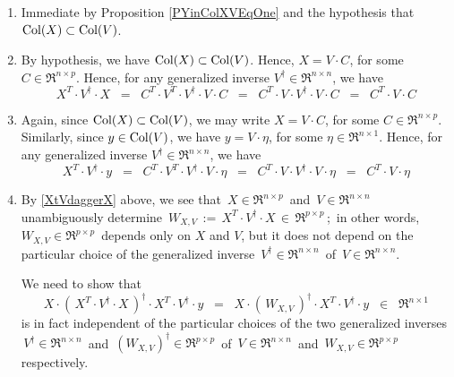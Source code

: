 \begin{enumerate}
\item
	Immediate by Proposition \ref{PYinColXVEqOne} and the hypothesis that $\textnormal{Col}(X) \subset \textnormal{Col}(V)$.
\item
	By hypothesis, we have $\textnormal{Col}(X) \subset \textnormal{Col}(V)$.
	Hence, $X = V \cdot C$, for some $C \in \Re^{n \times p}$.
	Hence, for any generalized inverse $V^{\dagger} \in \Re^{n \times n}$,
	we have
	\begin{equation*}
	X^{T} \cdot V^{\dagger} \cdot X
	\;\; = \;\;
		C^{T} \cdot V^{T} \cdot V^{\dagger} \cdot V \cdot C
	\;\; = \;\;
		C^{T} \cdot V \cdot V^{\dagger} \cdot V \cdot C
	\;\; = \;\;
		C^{T} \cdot V \cdot C
	\end{equation*}
\item
	Again, since $\textnormal{Col}(X) \subset \textnormal{Col}(V)$, we may write
	$X = V \cdot C$, for some $C \in \Re^{n \times p}$.
	Similarly, since $y \in \textnormal{Col}(V)$, we have $y = V \cdot \eta$,
	for some $\eta \in \Re^{n \times 1}$.
	Hence, for any generalized inverse $V^{\dagger} \in \Re^{n \times n}$,
	we have
	\begin{equation*}
	X^{T} \cdot V^{\dagger} \cdot y
	\;\; = \;\;
		C^{T} \cdot V^{T} \cdot V^{\dagger} \cdot V \cdot \eta
	\;\; = \;\;
		C^{T} \cdot V \cdot V^{\dagger} \cdot V \cdot  \eta
	\;\; = \;\;
		C^{T} \cdot V \cdot \eta
	\end{equation*}
\item
	By \eqref{XtVdaggerX} above, we see that
	\,$X \in \Re^{n \times p}$\, and \,$V \in \Re^{n \times n}$\,
	unambiguously determine
	\,$W_{X,V} \, := \, X^{T} \cdot V^{\dagger} \cdot X \, \in \, \Re^{p \times p}$\,;\,
	in other words, \,$W_{X,V} \in \Re^{p \times p}$\, depends only on $X$ and $V$,
	but it does not depend on the particular choice of the generalized inverse
	\,$V^{\dagger} \in \Re^{n \times n}$\, of \,$V \in \Re^{n \times n}$.
	
	We need to show that
	\begin{equation*}
	X \cdot \left(\,X^{T} \cdot V^{\dagger} \cdot X\,\right)^{\dagger} \cdot X^{T} \cdot V^{\dagger} \cdot y
	\;\; = \;\;
		X \cdot \left(\,W_{X,V}\,\right)^{\dagger} \cdot X^{T} \cdot V^{\dagger} \cdot y
	\;\; \in \;\; \Re^{n \times 1}
	\end{equation*}
	is in fact independent of the particular choices of the two generalized inverses
	\,$V^{\dagger} \in \Re^{n \times n}$\, and \,$(W_{X,V})^{\dagger} \in \Re^{p \times p}$\,
	of \,$V \in \Re^{n \times n}$\, and \,$W_{X,V} \in \Re^{p \times p}$\, respectively.


\end{enumerate}
